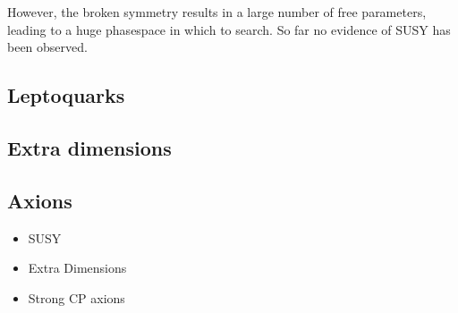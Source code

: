 However, the broken symmetry results in a large number of free parameters, leading to a huge phasespace in which to search. So far no evidence of SUSY has been observed.

\subsection{Leptoquarks}

\subsection{Extra dimensions}

\subsection{Axions}

{\color{Red}
\begin{itemize}
\item SUSY
\item Extra Dimensions
\item Strong CP axions 
\end{itemize}
}

